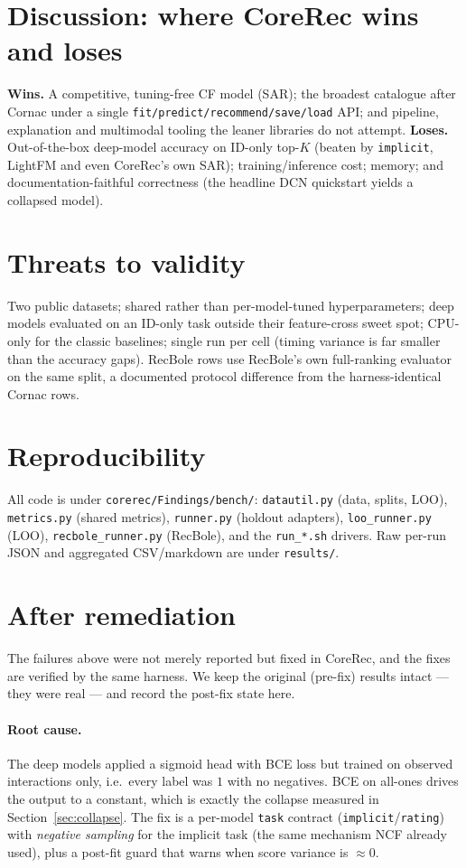 \documentclass[10pt]{article}
\begin{document}
\section{Discussion: where CoreRec wins and loses}
\textbf{Wins.} A competitive, tuning-free CF model (SAR); the broadest catalogue
after Cornac under a single \texttt{fit/predict/recommend/save/load} API; and
pipeline, explanation and multimodal tooling the leaner libraries do not attempt.
\textbf{Loses.} Out-of-the-box deep-model accuracy on ID-only top-$K$ (beaten by
\texttt{implicit}, LightFM and even CoreRec's own SAR); training/inference cost;
memory; and documentation-faithful correctness (the headline DCN quickstart
yields a collapsed model).

\section{Threats to validity}
Two public datasets; shared rather than per-model-tuned hyperparameters; deep
models evaluated on an ID-only task outside their feature-cross sweet spot;
CPU-only for the classic baselines; single run per cell (timing variance is far
smaller than the accuracy gaps). RecBole rows use RecBole's own full-ranking
evaluator on the same split, a documented protocol difference from the
harness-identical Cornac rows.

\section{Reproducibility}
All code is under \texttt{corerec/Findings/bench/}: \texttt{datautil.py} (data,
splits, LOO), \texttt{metrics.py} (shared metrics), \texttt{runner.py} (holdout
adapters), \texttt{loo\_runner.py} (LOO), \texttt{recbole\_runner.py} (RecBole),
and the \texttt{run\_*.sh} drivers. Raw per-run JSON and aggregated CSV/markdown
are under \texttt{results/}.

\section{After remediation}
\label{sec:remediation}
The failures above were not merely reported but fixed in CoreRec, and the fixes
are verified by the same harness. We keep the original (pre-fix) results intact ---
they were real --- and record the post-fix state here.

\paragraph{Root cause.} The deep models applied a sigmoid head with BCE loss but
trained on observed interactions only, i.e.\ every label was $1$ with no
negatives. BCE on all-ones drives the output to a constant, which is exactly the
collapse measured in Section~\ref{sec:collapse}. The fix is a per-model
\texttt{task} contract (\texttt{implicit}/\texttt{rating}) with \emph{negative
sampling} for the implicit task (the same mechanism NCF already used), plus a
post-fit guard that warns when score variance is $\approx 0$.
\end{document}
